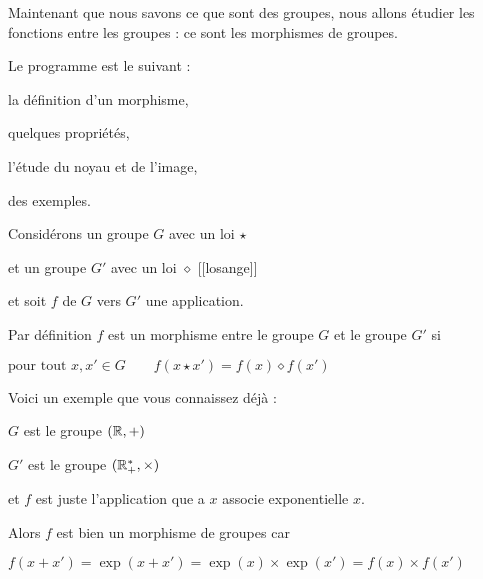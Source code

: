 







\debuttexte



\diapo


\change

Maintenant que  nous savons ce que sont des groupes, nous allons étudier les fonctions
entre les groupes : ce sont les morphismes de groupes.

Le programme est le suivant :

\change

la définition d'un morphisme,

\change

quelques propriétés,

\change

l'étude du noyau et de l'image,

\change

des exemples.


\diapo

Considérons un groupe $G$ avec un loi $\star$

et un groupe $G'$ avec un loi $\diamond$ [[losange]]

et soit $f$ de $G $ vers $G'$ une application.

\change

Par définition $f$ est un morphisme entre le groupe $G$ et le groupe $G'$ si

$\text{pour tout } x,x' \in G  \qquad f(x \star x') = f(x) \diamond f(x')$

\change

Voici un exemple que vous connaissez déjà :

$G$ est le groupe $(\mathbb{R},+)$

$G'$ est le groupe $(\mathbb{R}_+^*,\times)$

et $f$ est juste l'application que a $x$ associe exponentielle $x$.

\change

Alors $f$ est bien un morphisme de groupes car

$f(x+x') =\exp(x+x')= \exp(x) \times \exp(x') = f(x) \times f(x')$


\diapo

